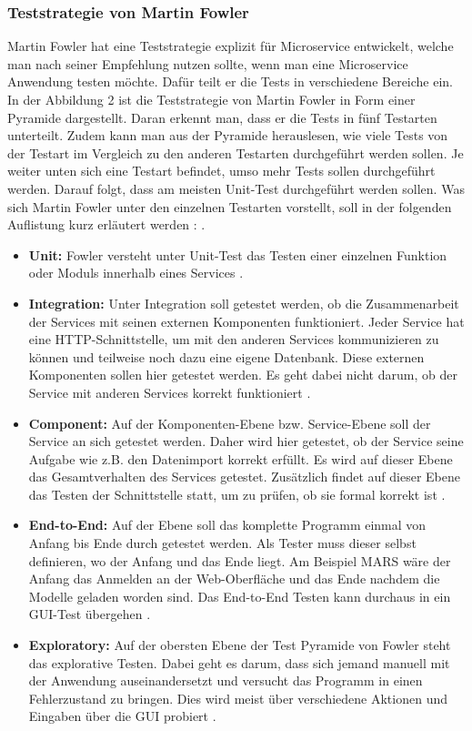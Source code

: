 \documentclass{llncs}
\begin{document}
\subsubsection{Teststrategie von Martin Fowler}
Martin Fowler hat eine Teststrategie explizit für Microservice entwickelt, welche man nach seiner Empfehlung nutzen sollte, wenn man eine Microservice Anwendung testen möchte. Dafür teilt er die Tests in verschiedene Bereiche ein. In der Abbildung 2 \label{fig:PyramideFowler} ist die Teststrategie von Martin Fowler in Form einer Pyramide dargestellt. Daran erkennt man, dass er die Tests in fünf Testarten unterteilt. Zudem kann man aus der Pyramide herauslesen, wie viele Tests von der Testart im Vergleich zu den anderen Testarten durchgeführt werden sollen. Je weiter unten sich eine Testart befindet, umso mehr Tests sollen durchgeführt werden. Darauf folgt, dass am meisten Unit-Test durchgeführt werden sollen. Was sich Martin Fowler unter den einzelnen Testarten vorstellt, soll in der folgenden Auflistung kurz erläutert werden \cite{Fowler2014testing} :
. 
\begin{itemize}
\item \textbf{Unit:} Fowler versteht unter Unit-Test das Testen einer einzelnen Funktion oder Moduls innerhalb eines Services \cite{Fowler2014testing}.
\item \textbf{Integration:} Unter Integration soll getestet werden, ob die Zusammenarbeit der Services mit seinen externen Komponenten funktioniert. Jeder Service hat eine HTTP-Schnittstelle, um mit den anderen Services kommunizieren zu können und teilweise noch dazu eine eigene Datenbank. Diese externen Komponenten sollen hier getestet werden. Es geht dabei nicht darum, ob der Service mit anderen Services korrekt funktioniert \cite{Fowler2014testing}.
\item \textbf{Component:} Auf der Komponenten-Ebene bzw. Service-Ebene soll der Service an sich getestet werden. Daher wird hier getestet, ob der Service seine Aufgabe wie z.B. den Datenimport korrekt erfüllt. Es wird auf dieser Ebene das Gesamtverhalten des Services getestet. Zusätzlich findet auf dieser Ebene das Testen der Schnittstelle statt, um zu prüfen, ob sie formal korrekt ist \cite{Fowler2014testing}.
\item \textbf{End-to-End:} Auf der Ebene soll das komplette Programm einmal von Anfang bis Ende durch getestet werden. Als Tester muss dieser selbst definieren, wo der Anfang und das Ende liegt. Am Beispiel MARS wäre der Anfang das Anmelden an der Web-Oberfläche und das Ende nachdem die Modelle geladen worden sind. Das End-to-End Testen kann durchaus in ein GUI-Test übergehen \cite{Fowler2014testing}.
\item \textbf{Exploratory:} Auf der obersten Ebene der Test Pyramide von Fowler steht das explorative Testen. Dabei geht es darum, dass sich jemand manuell mit der Anwendung auseinandersetzt und versucht das Programm in einen Fehlerzustand zu bringen. Dies wird meist über verschiedene Aktionen und Eingaben über die GUI probiert \cite{Fowler2014testing}.
\end{itemize}
\end{document}
